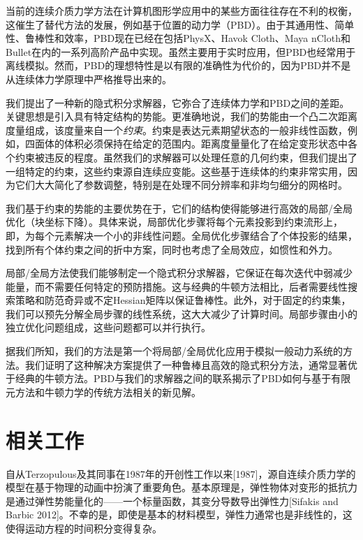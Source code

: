 \begin{translation}
当前的连续介质力学方法在计算机图形学应用中的某些方面往往存在不利的权衡，这催生了替代方法的发展，例如基于位置的动力学（PBD）。由于其通用性、简单性、鲁棒性和效率，PBD现在已经在包括PhysX、Havok Cloth、Maya nCloth和Bullet在内的一系列高阶产品中实现。虽然主要用于实时应用，但PBD也经常用于离线模拟。然而，PBD的理想特性是以有限的准确性为代价的，因为PBD并不是从连续体力学原理中严格推导出来的。

我们提出了一种新的隐式积分求解器，它弥合了连续体力学和PBD之间的差距。关键思想是引入具有特定结构的势能。更准确地说，我们的势能由一个凸二次距离度量组成，该度量来自一个\emph{约束}。约束是表达元素期望状态的一般非线性函数，例如，四面体的体积必须保持在给定的范围内。距离度量量化了在给定变形状态中各个约束被违反的程度。虽然我们的求解器可以处理任意的几何约束，但我们提出了一组特定的约束，这些约束源自连续应变能。这些基于连续体的约束非常实用，因为它们大大简化了参数调整，特别是在处理不同分辨率和非均匀细分的网格时。

我们基于约束的势能的主要优势在于，它们的结构使得能够进行高效的局部/全局优化（块坐标下降）。具体来说，局部优化步骤将每个元素投影到约束流形上，即，为每个元素解决一个小的非线性问题。全局优化步骤结合了个体投影的结果，找到所有个体约束之间的折中方案，同时也考虑了全局效应，如惯性和外力。

局部/全局方法使我们能够制定一个隐式积分求解器，它保证在每次迭代中弱减少能量，而不需要任何特定的预防措施。这与经典的牛顿方法相比，后者需要线性搜索策略和防范奇异或不定Hessian矩阵以保证鲁棒性。此外，对于固定的约束集，我们可以预先分解全局步骤的线性系统，这大大减少了计算时间。局部步骤由小的独立优化问题组成，这些问题都可以并行执行。

据我们所知，我们的方法是第一个将局部/全局优化应用于模拟一般动力系统的方法。我们证明了这种解决方案提供了一种鲁棒且高效的隐式积分方法，通常显著优于经典的牛顿方法。PBD与我们的求解器之间的联系揭示了PBD如何与基于有限元方法和牛顿力学的传统方法相关的新见解。

\section{相关工作}

自从Terzopulous及其同事在1987年的开创性工作以来[1987]，源自连续介质力学的模型在基于物理的动画中扮演了重要角色。基本原理是，弹性物体对变形的抵抗力是通过弹性势能量化的——一个标量函数，其变分导数导出弹性力[Sifakis and Barbic 2012]。不幸的是，即使是基本的材料模型，弹性力通常也是非线性的，这使得运动方程的时间积分变得复杂。


\end{translation}
